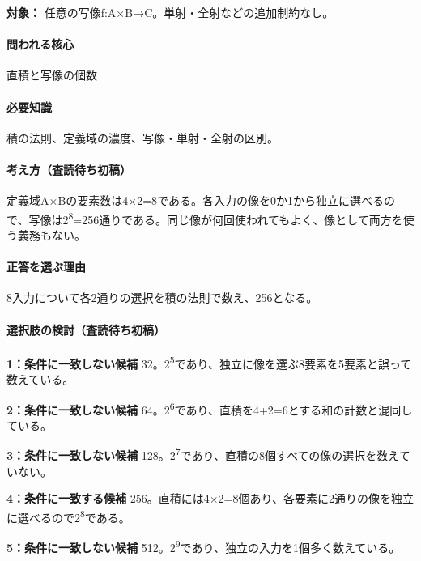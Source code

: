 \noindent\textbf{対象：} 任意の写像f:A×B→C。単射・全射などの追加制約なし。\par

\paragraph{問われる核心} 直積と写像の個数

\paragraph{必要知識} 積の法則、定義域の濃度、写像・単射・全射の区別。

\paragraph{考え方（査読待ち初稿）} 定義域A×Bの要素数は4×2=\allowbreak{}8である。各入力の像を0か1から独立に選べるので、写像は2\textsuperscript{8}=256通りである。同じ像が何回使われてもよく、像として両方を使う義務もない。

\paragraph{正答を選ぶ理由} 8入力について各2通りの選択を積の法則で数え、256となる。

\paragraph{選択肢の検討（査読待ち初稿）}\mbox{}\par

\noindent\textbf{1：条件に一致しない候補} 32。2\textsuperscript{5}であり、独立に像を選ぶ8要素を5要素と誤って数えている。\par

\noindent\textbf{2：条件に一致しない候補} 64。2\textsuperscript{6}であり、直積を4+2=\allowbreak{}6とする和の計数と混同している。\par

\noindent\textbf{3：条件に一致しない候補} 128。2\textsuperscript{7}であり、直積の8個すべての像の選択を数えていない。\par

\noindent\textbf{4：条件に一致する候補} 256。直積には4×2=\allowbreak{}8個あり、各要素に2通りの像を独立に選べるので2\textsuperscript{8}である。\par

\noindent\textbf{5：条件に一致しない候補} 512。2\textsuperscript{9}であり、独立の入力を1個多く数えている。\par

